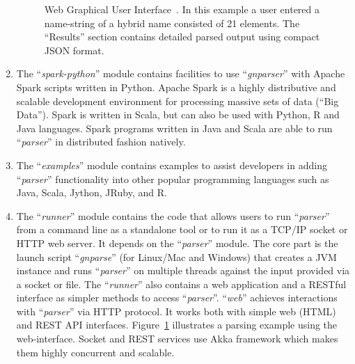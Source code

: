 \documentclass{bmcart}
\begin{document}
\begin{enumerate}
\begin{itemize}
\end{itemize}

\begin{figure}
  \begin{center}

    \caption{Web Graphical User Interface~\cite{gnparser-web}. In this example a user entered a name-string of a hybrid name consisted of 21 elements.  The ``Results'' section contains detailed parsed output using compact JSON format.}\label{figure:webgui}

  \end{center}
\end{figure}

  \item The ``\textit{spark-python}'' module contains facilities to use ``\textit{gnparser}'' with Apache Spark scripts written in Python. Apache Spark is a highly distributive and scalable development environment for processing massive sets of data (``Big Data''). Spark is written in Scala, but can also be used with Python, R and Java languages. Spark programs written in Java and Scala are able to run ``\textit{parser}'' in distributed fashion natively.

  \item The ``\textit{examples}'' module contains examples to assist developers in adding ``\textit{parser}'' functionality into other popular programming languages such as Java, Scala, Jython, JRuby, and R.

  \item The ``\textit{runner}'' module contains the code that allows users to run ``\textit{parser}'' from a command line as a standalone tool or to run it as a TCP/IP socket or HTTP web server. It depends on the ``\textit{parser}'' module. The core part is the launch script ``\textit{gnparse}'' (for Linux/Mac and Windows) that creates a JVM instance and runs ``\textit{parser}'' on multiple threads against the input provided via a socket or file. The ``\textit{runner}'' also contains a web application and a RESTful interface as simpler methods to access ``\textit{parser}''. ``\textit{web}'' achieves interactions with ``\textit{parser}'' via HTTP protocol. It works both with simple web (HTML) and REST API interfaces. Figure~\ref{figure:webgui} illustrates a parsing example using the web-interface. Socket and REST services use Akka framework which makes them highly concurrent and scalable.

\end{enumerate}
\end{document}
